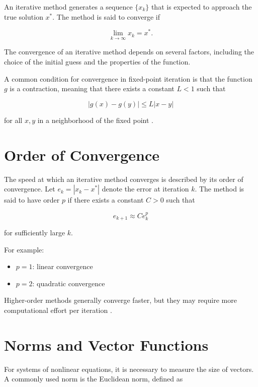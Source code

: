 An iterative method generates a sequence \( \{x_k\} \) that is expected to approach the true solution \( x^* \). The method is said to converge if

\begin{equation}
\lim_{k \to \infty} x_k = x^*.
\end{equation}

The convergence of an iterative method depends on several factors, including the choice of the initial guess and the properties of the function.

A common condition for convergence in fixed-point iteration is that the function \( g \) is a contraction, meaning that there exists a constant \( L < 1 \) such that

\begin{equation}
|g(x) - g(y)| \leq L |x - y|
\end{equation}

for all \( x, y \) in a neighborhood of the fixed point \cite{burden, cs357}.

\section{Order of Convergence}

The speed at which an iterative method converges is described by its order of convergence. Let \( e_k = |x_k - x^*| \) denote the error at iteration \( k \). The method is said to have order \( p \) if there exists a constant \( C > 0 \) such that

\begin{equation}
e_{k+1} \approx C e_k^p
\end{equation}

for sufficiently large \( k \).

For example:
\begin{itemize}
    \item \( p = 1 \): linear convergence
    \item \( p = 2 \): quadratic convergence
\end{itemize}

Higher-order methods generally converge faster, but they may require more computational effort per iteration \cite{burden}.

\section{Norms and Vector Functions}

For systems of nonlinear equations, it is necessary to measure the size of vectors. A commonly used norm is the Euclidean norm, defined as

